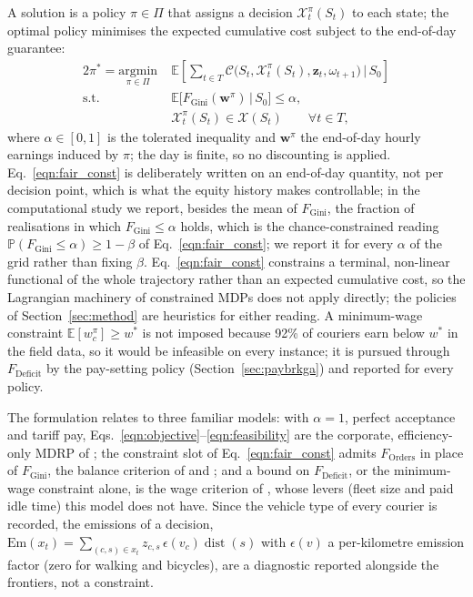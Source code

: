 \documentclass[a4paper,11pt,review,3p,authoryear]{elsarticle}
\newcommand{\FG}{F_{\text{Gini}}}
\newcommand{\FD}{F_{\text{Deficit}}}
\newcommand{\FO}{F_{\text{Orders}}}
\DeclareMathOperator{\dist}{dist}
\begin{document}
A solution is a policy $\pi \in \Pi$ that assigns a decision $\mathcal{X}^\pi_t(S_t)$ to each state; the optimal policy minimises the expected cumulative cost subject to the end-of-day guarantee:
\begin{alignat}{2}
\pi^{*} = \underset{\pi \in \Pi}{\mathrm{argmin}}\;& \mathbb{E}\left[\sum_{t \in T} \mathcal{C}\bigl(S_t, \mathcal{X}^\pi_t(S_t), \mathbf{z}_t, \omega_{t+1}\bigr) \,\Big|\, S_0 \right] \label{eqn:objective}\\
\text{s.t.}\;\; & \mathbb{E}\bigl[\FG(\mathbf{w}^{\pi}) \,\big|\, S_0\bigr] \le \alpha, \label{eqn:fair_const}\\
& \mathcal{X}^\pi_t(S_t) \in \mathcal{X}(S_t) \qquad \forall t \in T, \label{eqn:feasibility}
\end{alignat}
where $\alpha \in [0,1]$ is the tolerated inequality and $\mathbf{w}^{\pi}$ the end-of-day hourly earnings induced by $\pi$; the day is finite, so no discounting is applied. Eq.~\eqref{eqn:fair_const} is deliberately written on an end-of-day quantity, not per decision point, which is what the equity history makes controllable; in the computational study we report, besides the mean of $\FG$, the fraction of realisations in which $\FG \le \alpha$ holds, which is the chance-constrained reading $\mathbb{P}(\FG \le \alpha) \ge 1 - \beta$ of Eq.~\eqref{eqn:fair_const}; we report it for every $\alpha$ of the grid rather than fixing $\beta$. Eq.~\eqref{eqn:fair_const} constrains a terminal, non-linear functional of the whole trajectory rather than an expected cumulative cost, so the Lagrangian machinery of constrained MDPs \citep{altman1999constrained,borkar2005actor} does not apply directly; the policies of Section~\ref{sec:method} are heuristics for either reading. A minimum-wage constraint $\mathbb{E}[w_c^{\pi}] \ge w^*$ is not imposed because 92\% of couriers earn below $w^*$ in the field data, so it would be infeasible on every instance; it is pursued through $\FD$ by the pay-setting policy (Section~\ref{sec:paybrkga}) and reported for every policy.

The formulation relates to three familiar models: with $\alpha = 1$, perfect acceptance and tariff pay, Eqs.~\eqref{eqn:objective}--\eqref{eqn:feasibility} are the corporate, efficiency-only MDRP of \cite{reyes2018meal}; the constraint slot of Eq.~\eqref{eqn:fair_const} admits $\FO$ in place of $\FG$, the balance criterion of \cite{wen2010dynamic} and \cite{liao2020multi}; and a bound on $\FD$, or the minimum-wage constraint alone, is the wage criterion of \cite{nair2022work4food}, whose levers (fleet size and paid idle time) this model does not have. Since the vehicle type of every courier is recorded, the emissions of a decision, $\text{Em}(x_t) = \sum_{(c,s) \in x_t} z_{c,s}\, \epsilon(v_c) \dist(s)$ with $\epsilon(v)$ a per-kilometre emission factor (zero for walking and bicycles), are a diagnostic reported alongside the frontiers, not a constraint.
\end{document}
